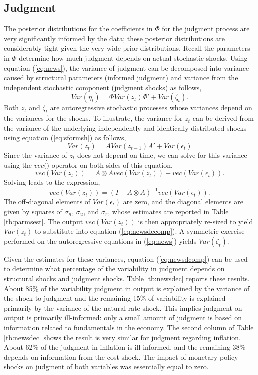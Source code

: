 \documentclass[12pt]{article}
\newcommand{\beq}{\begin{equation}}
\newcommand{\eeq}{\end{equation}}
\newcommand{\bdm}{\begin{displaymath}}
\newcommand{\edm}{\end{displaymath}}
\begin{document}
{\subsection{Judgment}
The posterior distributions for the coefficients in $\Phi$ for the judgment process are very significantly informed by the data; these posterior distributions are considerably tight given the very wide prior distributions.  Recall the parameters in $\Phi$ determine how much judgment depends on actual stochastic shocks.  Using equation (\ref{eq:news}), the variance of judgment can be decomposed into variance caused by structural parameters (informed judgment) and variance from the independent stochastic component (judgment shocks) as follows,
\beq \label{eq:newsdecomp} Var(\eta_t) = \Phi Var(z_t) \Phi' + Var(\zeta_t). \eeq
Both $z_t$ and $\zeta_t$ are autoregressive stochastic processes whose variances depend on the variances for the shocks.  To illustrate, the variance for $z_t$ can be derived from the variance of the underlying independently and identically distributed shocks using equation (\ref{eq:sformsh}) as follows,
\bdm Var(z_t) = A Var(z_{t-1}) A' + Var(\epsilon_t) \edm
Since the variance of $z_t$ does not depend on time, we can solve for this variance using the $vec(\dot)$ operator on both sides of this equation,
\bdm vec(Var(z_t)) = A \otimes A vec(Var(z_t)) + vec(Var(\epsilon_t)). \edm
Solving leads to the expression,
\beq vec(Var(z_t)) = (I - A \otimes A)^{-1} vec(Var(\epsilon_t)). \eeq
The off-diagonal elements of $Var(\epsilon_t)$ are zero, and the diagonal elements are given by squares of $\sigma_n$, $\sigma_u$, and $\sigma_r$, whose estimates are reported in Table \ref{tb:parmsest}.  The output $vec(Var(z_t))$ is then appropriately re-sized to yield $Var(z_t)$ to substitute into equation (\ref{eq:newsdecomp}).  A symmetric exercise performed on the autoregressive equations in (\ref{eq:news}) yields $Var(\zeta_t)$.  

Given the estimates for these variances, equation (\ref{eq:newsdcomp}) can be used to determine what percentage of the variability in judgment depends on structural shocks and judgment shocks.  Table \ref{tb:newsdec} reports these results.  About 85\% of the variability judgment in output is explained by the variance of the shock to judgment and the remaining 15\% of variability is explained primarily by the variance of the natural rate shock.  This implies judgment on output is primarily ill-informed: only a small amount of judgment is based on information related to fundamentals in the economy.  The second column of Table \ref{tb:newsdec} shows the result is very similar for judgment regarding inflation.  About 62\% of the judgment in inflation is ill-informed, and the remaining 38\% depends on information from the cost shock.  The impact of monetary policy shocks on judgment of both variables was essentially equal to zero.

}
\end{document}
